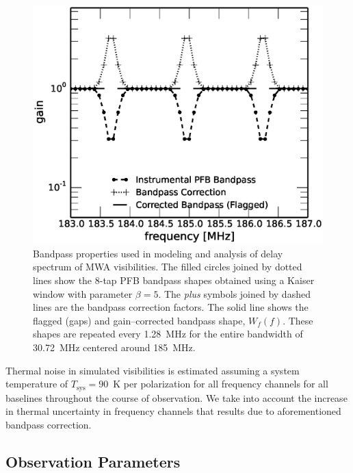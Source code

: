 \documentclass[preprint2,iop,numberedappendix]{emulateapj}
\begin{document}
\begin{figure}[htb]
\centering
\includegraphics[width=\linewidth]{figures/v1_0/bandpass_properties}
\caption{Bandpass properties used in modeling and analysis of delay spectrum of MWA visibilities. The filled circles joined by dotted lines show the 8-tap PFB bandpass shapes obtained using a Kaiser window with parameter $\beta=5$. The {\it plus} symbols joined by dashed lines are the bandpass correction factors. The solid line shows the flagged (gaps) and gain--corrected bandpass shape, $W_f(f)$. These shapes are repeated every 1.28~MHz for the entire bandwidth of 30.72~MHz centered around 185~MHz. \label{fig:bandpass}}
\end{figure}

Thermal noise in simulated visibilities is estimated assuming a system temperature of $T_\textrm{sys}=90$~K per polarization for all frequency channels for all baselines throughout the course of observation. We take into account the increase in thermal uncertainty in frequency channels that results due to aforementioned bandpass correction. %

\subsection{Observation Parameters}\label{sec:obsparms}
\end{document}
